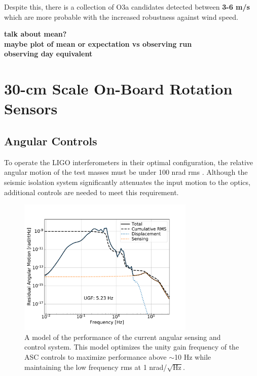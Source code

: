 \documentclass [12pt, proquest]{uwthesis}[2019]
\begin{document}
Despite this, there is a collection of O3a candidates detected between \textbf{3-6 m/s} which are more probable with the increased robustness against wind speed.

\textbf{talk about mean?}\\
\textbf{maybe plot of mean or expectation vs observing run}\\
\textbf{observing day equivalent}

\chapter{30-cm Scale On-Board Rotation Sensors}\label{cBRS_chap}
\section{Angular Controls}\label{ASC}
To operate the LIGO interferometers in their optimal configuration, the relative angular motion of the test masses must be under 100 nrad rms \cite{ASC}. Although the seismic isolation system significantly attenuates the input motion to the optics, additional controls are needed to meet this requirement. 

\begin{figure}[!h]
\begin{center}
\includegraphics[width=0.75\textwidth]{cBRS_ASC_Without.pdf}
\caption[Model of the performance of the current angular sensing and control system]{A model of the performance of the current angular sensing and control system. This model optimizes the unity gain frequency of the ASC controls to maximize performance above $\sim$10 Hz while maintaining the low frequency rms at 1 nrad/$\sqrt{\text{Hz}}$.}
\label{ascWithout}
\end{center}
\end{figure}
\end{document}
